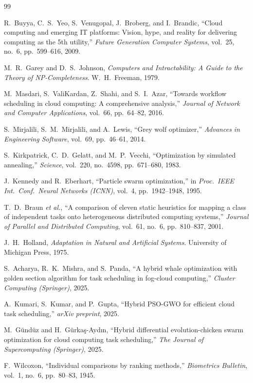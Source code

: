 \documentclass[conference]{IEEEtran}
\begin{document}
\begin{thebibliography}{99}

R.~Buyya, C.~S.~Yeo, S.~Venugopal, J.~Broberg, and I.~Brandic, ``Cloud computing and emerging IT platforms: Vision, hype, and reality for delivering computing as the 5th utility,'' \textit{Future Generation Computer Systems}, vol.~25, no.~6, pp.~599--616, 2009.

M.~R.~Garey and D.~S.~Johnson, \textit{Computers and Intractability: A Guide to the Theory of NP-Completeness}. W.~H.~Freeman, 1979.

M.~Masdari, S.~ValiKardan, Z.~Shahi, and S.~I.~Azar, ``Towards workflow scheduling in cloud computing: A comprehensive analysis,'' \textit{Journal of Network and Computer Applications}, vol.~66, pp.~64--82, 2016.

S.~Mirjalili, S.~M.~Mirjalili, and A.~Lewis, ``Grey wolf optimizer,'' \textit{Advances in Engineering Software}, vol.~69, pp.~46--61, 2014.

S.~Kirkpatrick, C.~D.~Gelatt, and M.~P.~Vecchi, ``Optimization by simulated annealing,'' \textit{Science}, vol.~220, no.~4598, pp.~671--680, 1983.

J.~Kennedy and R.~Eberhart, ``Particle swarm optimization,'' in \textit{Proc.\ IEEE Int.\ Conf.\ Neural Networks (ICNN)}, vol.~4, pp.~1942--1948, 1995.

T.~D.~Braun \textit{et al.}, ``A comparison of eleven static heuristics for mapping a class of independent tasks onto heterogeneous distributed computing systems,'' \textit{Journal of Parallel and Distributed Computing}, vol.~61, no.~6, pp.~810--837, 2001.

J.~H.~Holland, \textit{Adaptation in Natural and Artificial Systems}. University of Michigan Press, 1975.

S.~Acharya, R.~K.~Mishra, and S.~Panda, ``A hybrid whale optimization with golden section algorithm for task scheduling in fog-cloud computing,'' \textit{Cluster Computing (Springer)}, 2025.

A.~Kumari, S.~Kumar, and P.~Gupta, ``Hybrid PSO-GWO for efficient cloud task scheduling,'' \textit{arXiv preprint}, 2025.

M.~G\"{u}nd\"{u}z and H.~G\"{u}rka\c{s}-Ayd\i n, ``Hybrid differential evolution-chicken swarm optimization for cloud computing task scheduling,'' \textit{The Journal of Supercomputing (Springer)}, 2025.

F.~Wilcoxon, ``Individual comparisons by ranking methods,'' \textit{Biometrics Bulletin}, vol.~1, no.~6, pp.~80--83, 1945.

\end{thebibliography}
\end{document}
